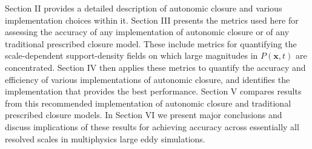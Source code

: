 Section II provides a detailed description of autonomic closure and various implementation choices within it. Section III presents the metrics used here for assessing the accuracy of any implementation of autonomic closure or of any traditional prescribed closure model. These include metrics for quantifying the scale-dependent support-density fields on which large magnitudes in   $P(\mathbf{x},t)$  are concentrated. Section IV then applies these metrics to quantify the accuracy and efficiency of various implementations of autonomic closure, and identifies the implementation that provides the best performance. Section V compares results from this recommended implementation of autonomic closure and traditional prescribed closure models. In Section VI we present major conclusions and discuss implications of these results for achieving accuracy across essentially all resolved scales in multiphysics large eddy simulations. 

